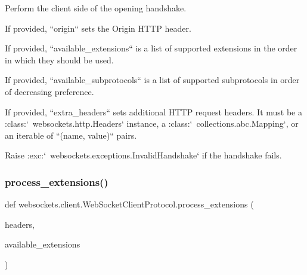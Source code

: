 \begin{DoxyVerb}Perform the client side of the opening handshake.

If provided, ``origin`` sets the Origin HTTP header.

If provided, ``available_extensions`` is a list of supported
extensions in the order in which they should be used.

If provided, ``available_subprotocols`` is a list of supported
subprotocols in order of decreasing preference.

If provided, ``extra_headers`` sets additional HTTP request headers.
It must be a :class:`~websockets.http.Headers` instance, a
:class:`~collections.abc.Mapping`, or an iterable of ``(name, value)``
pairs.

Raise :exc:`~websockets.exceptions.InvalidHandshake` if the handshake
fails.\end{DoxyVerb}
 \mbox{\label{classwebsockets_1_1client_1_1_web_socket_client_protocol_a8eb91cac7cf0e06122efee88b4819933}} 
\subsubsection{\texorpdfstring{process\+\_\+extensions()}{process\_extensions()}}
{\footnotesize\ttfamily def websockets.\+client.\+Web\+Socket\+Client\+Protocol.\+process\+\_\+extensions (\begin{DoxyParamCaption}\item[{}]{headers,  }\item[{}]{available\+\_\+extensions }\end{DoxyParamCaption})\hspace{0.3cm}{\ttfamily [static]}}

